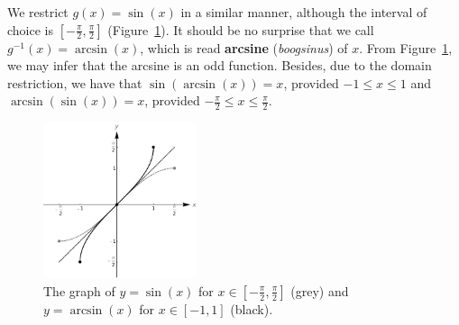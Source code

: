 We restrict $g(x) = \sin(x)$ in a similar manner, although the interval of choice is $\left[ -\frac{\pi}{2}, \frac{\pi}{2}\right]$ (Figure~\ref{fig_trans_34}). It should be no surprise that we call $g^{-1}(x) = \arcsin(x)$, which is read \textbf{arcsine} (\textit{boogsinus}) of $x$. From Figure~\ref{fig_trans_34}, we may infer that the arcsine is an odd function. Besides, due to the domain restriction, we have that $\sin(\arcsin(x)) = x$,  provided $-1 \leq x \leq 1$ and  $\arcsin(\sin(x)) = x$, provided $-\frac{\pi}{2} \leq x \leq \frac{\pi}{2}$.    


\begin{figure}[H]
			\centering
\centerline{
\includegraphics[width=0.4\textwidth]{fig_trans_34}
}
	\caption{The graph of $y=\sin(x)$ for $x\in\left[-\frac{\pi}{2}, \frac{\pi}{2}\right]$ (grey) and $y=\arcsin(x)$ for $x\in[-1, 1]$ (black).}
\label{fig_trans_34}
\end{figure}


